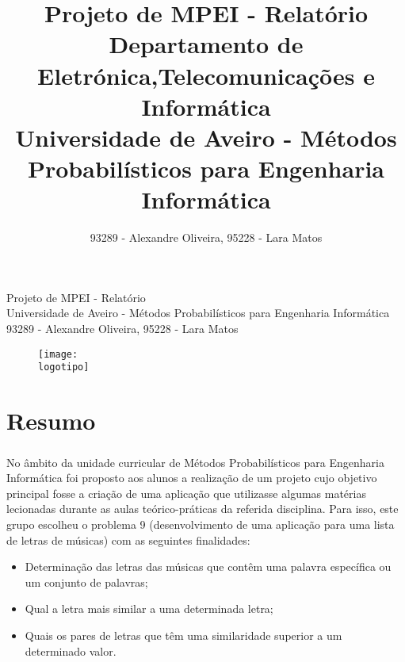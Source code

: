 \documentclass{report}
\begin{document}
%
\def\titulo{Projeto de MPEI - Relatório}
\def\autores{93289 - Alexandre Oliveira, 95228 - Lara Matos}
\def\departamento{Departamento de Eletrónica,Telecomunicações e Informática}
\def\empresa{Universidade de Aveiro - Métodos Probabilísticos para Engenharia Informática}
\def\logotipo{ua.pdf}

%
%
\begin{titlepage}

\begin{center}
%
\vspace*{50mm}
%
{\Huge \titulo}\\ 
%
\vspace{10mm}
%
{\Large \empresa}\\
%
\vspace{10mm}
%
{\LARGE \autores}\\ 
%
\vspace{30mm}
%
\begin{figure}[h]
\center
\texttt{[image: \\logotipo]}
\end{figure}
%
\vspace{30mm}
\end{center}
%
\end{titlepage}

\title{%
{\Huge\textbf{\titulo}}\\
{\Large \departamento\\ \empresa}
}
%
\author{%
    \autores \\
    \autorescontactos
}
%
\date{\data}
%


\clearpage
{}

\chapter{Resumo}
\label{chap.resumo}

\paragraph{ }
No âmbito da unidade curricular de Métodos Probabilísticos para Engenharia Informática foi proposto aos alunos a realização de um projeto cujo objetivo principal fosse a criação de uma aplicação que utilizasse algumas matérias lecionadas durante as aulas teórico-práticas da referida disciplina. Para isso, este grupo escolheu o problema 9 (desenvolvimento de uma aplicação para uma lista de letras de músicas) com as seguintes finalidades:
\begin{itemize}
	\item Determinação das letras das músicas que contêm uma palavra específica ou um conjunto de palavras;
	\item Qual a letra mais similar a uma determinada letra;
	\item Quais os pares de letras que têm uma similaridade superior a um determinado valor.
	\end{itemize}
\end{document}
